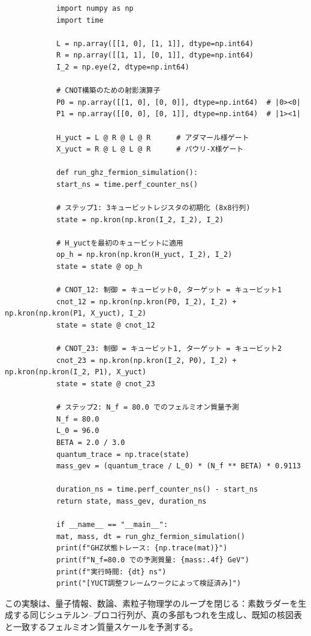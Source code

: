 \documentclass[11pt,a4paper]{article}
\begin{document}
	\begin{tcolorbox}[title=YUCT GHZおよびフェルミオン質量エミュレータ（Python）, breakable]
		\begin{lstlisting}
			import numpy as np
			import time
			
			L = np.array([[1, 0], [1, 1]], dtype=np.int64)
			R = np.array([[1, 1], [0, 1]], dtype=np.int64)
			I_2 = np.eye(2, dtype=np.int64)
			
			# CNOT構築のための射影演算子
			P0 = np.array([[1, 0], [0, 0]], dtype=np.int64)  # |0><0|
			P1 = np.array([[0, 0], [0, 1]], dtype=np.int64)  # |1><1|
			
			H_yuct = L @ R @ L @ R      # アダマール様ゲート
			X_yuct = R @ L @ L @ R      # パウリ-X様ゲート
			
			def run_ghz_fermion_simulation():
			start_ns = time.perf_counter_ns()
			
			# ステップ1: 3キュービットレジスタの初期化 (8x8行列)
			state = np.kron(np.kron(I_2, I_2), I_2)
			
			# H_yuctを最初のキュービットに適用
			op_h = np.kron(np.kron(H_yuct, I_2), I_2)
			state = state @ op_h
			
			# CNOT_12: 制御 = キュービット0, ターゲット = キュービット1
			cnot_12 = np.kron(np.kron(P0, I_2), I_2) + np.kron(np.kron(P1, X_yuct), I_2)
			state = state @ cnot_12
			
			# CNOT_23: 制御 = キュービット1, ターゲット = キュービット2
			cnot_23 = np.kron(np.kron(I_2, P0), I_2) + np.kron(np.kron(I_2, P1), X_yuct)
			state = state @ cnot_23
			
			# ステップ2: N_f = 80.0 でのフェルミオン質量予測
			N_f = 80.0
			L_0 = 96.0
			BETA = 2.0 / 3.0
			quantum_trace = np.trace(state)
			mass_gev = (quantum_trace / L_0) * (N_f ** BETA) * 0.9113
			
			duration_ns = time.perf_counter_ns() - start_ns
			return state, mass_gev, duration_ns
			
			if __name__ == "__main__":
			mat, mass, dt = run_ghz_fermion_simulation()
			print(f"GHZ状態トレース: {np.trace(mat)}")
			print(f"N_f=80.0 での予測質量: {mass:.4f} GeV")
			print(f"実行時間: {dt} ns")
			print("[YUCT調整フレームワークによって検証済み]")
		\end{lstlisting}
	\end{tcolorbox}
	
	この実験は、量子情報、数論、素粒子物理学のループを閉じる：素数ラダーを生成する同じシュテルン–ブロコ行列が、真の多部もつれを生成し、既知の核図表と一致するフェルミオン質量スケールを予測する。
	
\end{document}
